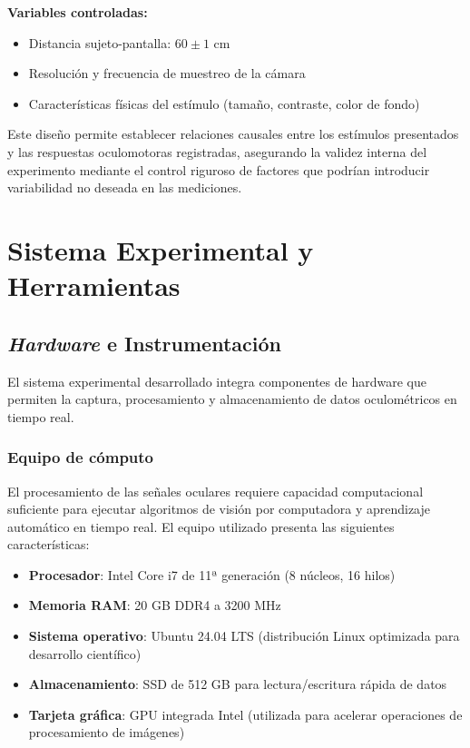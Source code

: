 \textbf{Variables controladas:}
\begin{itemize}
	\item Distancia sujeto-pantalla: $60 \pm 1$ cm
	\item Resolución y frecuencia de muestreo de la cámara
	\item Características físicas del estímulo (tamaño, contraste, color de fondo)
\end{itemize}

Este diseño permite establecer relaciones causales entre los estímulos presentados y las respuestas oculomotoras registradas, asegurando la validez interna del experimento mediante el control riguroso de factores que podrían introducir variabilidad no deseada en las mediciones.

\section{Sistema Experimental y Herramientas}

\subsection{\textit{Hardware} e Instrumentación}

El sistema experimental desarrollado integra componentes de hardware que permiten la captura, procesamiento y almacenamiento de datos oculométricos en tiempo real.

\subsubsection{Equipo de cómputo}

El procesamiento de las señales oculares requiere capacidad computacional suficiente para ejecutar algoritmos de visión por computadora y aprendizaje automático en tiempo real.
El equipo utilizado presenta las siguientes características:

\begin{itemize}
	\item \textbf{Procesador}: Intel Core i7 de 11ª generación (8 núcleos, 16 hilos)
	\item \textbf{Memoria RAM}: 20 GB DDR4 a 3200 MHz
	\item \textbf{Sistema operativo}: Ubuntu 24.04 LTS (distribución Linux optimizada para desarrollo científico)
	\item \textbf{Almacenamiento}: SSD de 512 GB para lectura/escritura rápida de datos
	\item \textbf{Tarjeta gráfica}: GPU integrada Intel (utilizada para acelerar operaciones de procesamiento de imágenes)
\end{itemize}

